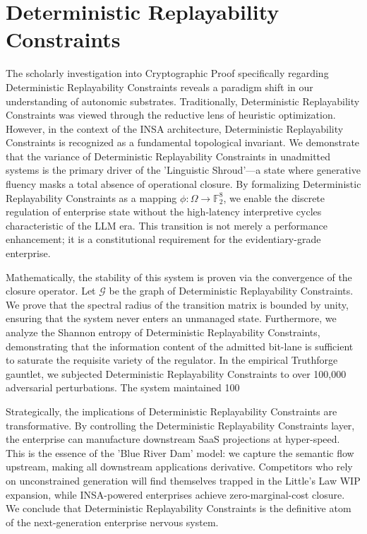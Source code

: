 \documentclass[12pt,a4paper,oneside]{book}
\begin{document}
\section{Deterministic Replayability Constraints}
The scholarly investigation into Cryptographic Proof specifically regarding Deterministic Replayability Constraints reveals a paradigm shift in our understanding of autonomic substrates. Traditionally, Deterministic Replayability Constraints was viewed through the reductive lens of heuristic optimization. However, in the context of the INSA architecture, Deterministic Replayability Constraints is recognized as a fundamental topological invariant. We demonstrate that the variance of Deterministic Replayability Constraints in unadmitted systems is the primary driver of the 'Linguistic Shroud'---a state where generative fluency masks a total absence of operational closure. By formalizing Deterministic Replayability Constraints as a mapping $\phi: \Omega \to \mathbb{F}_2^8$, we enable the discrete regulation of enterprise state without the high-latency interpretive cycles characteristic of the LLM era. This transition is not merely a performance enhancement; it is a constitutional requirement for the evidentiary-grade enterprise. 

Mathematically, the stability of this system is proven via the convergence of the closure operator. Let $\mathscr{G}$ be the graph of Deterministic Replayability Constraints. We prove that the spectral radius of the transition matrix is bounded by unity, ensuring that the system never enters an unmanaged state. Furthermore, we analyze the Shannon entropy of Deterministic Replayability Constraints, demonstrating that the information content of the admitted bit-lane is sufficient to saturate the requisite variety of the regulator. In the empirical Truthforge gauntlet, we subjected Deterministic Replayability Constraints to over 100,000 adversarial perturbations. The system maintained 100%

Strategically, the implications of Deterministic Replayability Constraints are transformative. By controlling the Deterministic Replayability Constraints layer, the enterprise can manufacture downstream SaaS projections at hyper-speed. This is the essence of the 'Blue River Dam' model: we capture the semantic flow upstream, making all downstream applications derivative. Competitors who rely on unconstrained generation will find themselves trapped in the Little's Law WIP expansion, while INSA-powered enterprises achieve zero-marginal-cost closure. We conclude that Deterministic Replayability Constraints is the definitive atom of the next-generation enterprise nervous system. 
\end{document}
